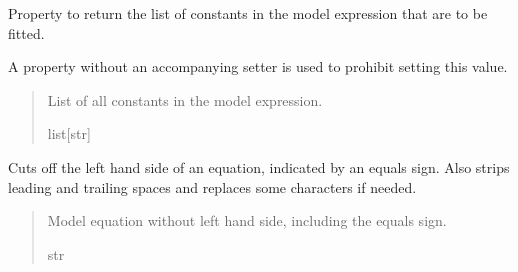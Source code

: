 \documentclass[letterpaper,10pt,english]{sphinxmanual}
\begin{document}
\begin{fulllineitems}
\begin{fulllineitems}
\end{fulllineitems}


\begin{fulllineitems}
\label{\detokenize{VPCModel:src.VPCModel.VPCModel.constants}}
\pysigstartsignatures
{}
\pysigstopsignatures
\sphinxAtStartPar
Property to return the list of constants in the model expression that are to be fitted.

\sphinxAtStartPar
A property without an accompanying setter is used to prohibit setting this value.
\begin{quote}\begin{description}
\sphinxAtStartPar
List of all constants in the model expression.

\sphinxAtStartPar
list{[}str{]}

\end{description}\end{quote}

\end{fulllineitems}


\begin{fulllineitems}
\label{\detokenize{VPCModel:src.VPCModel.VPCModel.cut_off_lhs}}
\pysigstartsignatures
{}
\pysigstopsignatures
\sphinxAtStartPar
Cuts off the left hand side of an equation, indicated by an equals sign.
Also strips leading and trailing spaces and replaces some characters if needed.
\begin{quote}\begin{description}
\sphinxAtStartPar
Model equation without left hand side, including the equals sign.

\sphinxAtStartPar
str

\end{description}\end{quote}

\end{fulllineitems}


\end{fulllineitems}
\end{document}

